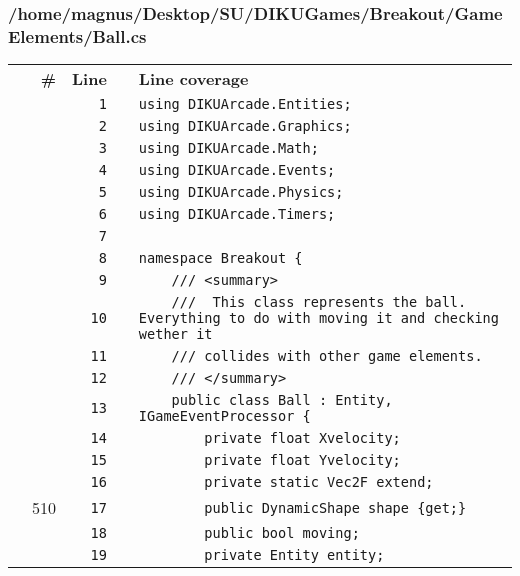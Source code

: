 \documentclass[a4paper,landscape,10pt]{article}
\begin{document}
\subsubsection{/home/magnus/Desktop/SU/DIKUGames/Breakout/GameElements/Ball.cs}
\begin{longtable}[l]{lrrll}
\textbf{} & \textbf{\#} & \textbf{Line} & \textbf{} & \textbf{Line coverage}\\
\cellcolor{gray} &  & \verb~1~ & & \verb~using DIKUArcade.Entities;~\\
\cellcolor{gray} &  & \verb~2~ & & \verb~using DIKUArcade.Graphics;~\\
\cellcolor{gray} &  & \verb~3~ & & \verb~using DIKUArcade.Math;~\\
\cellcolor{gray} &  & \verb~4~ & & \verb~using DIKUArcade.Events;~\\
\cellcolor{gray} &  & \verb~5~ & & \verb~using DIKUArcade.Physics;~\\
\cellcolor{gray} &  & \verb~6~ & & \verb~using DIKUArcade.Timers;~\\
\cellcolor{gray} &  & \verb~7~ & & \verb~~\\
\cellcolor{gray} &  & \verb~8~ & & \verb~namespace Breakout {~\\
\cellcolor{gray} &  & \verb~9~ & & \verb~    /// <summary>~\\
\cellcolor{gray} &  & \verb~10~ & & \verb~    ///  This class represents the ball. Everything to do with moving it and checking wether it~\\
\cellcolor{gray} &  & \verb~11~ & & \verb~    /// collides with other game elements.~\\
\cellcolor{gray} &  & \verb~12~ & & \verb~    /// </summary>~\\
\cellcolor{gray} &  & \verb~13~ & & \verb~    public class Ball : Entity, IGameEventProcessor {~\\
\cellcolor{gray} &  & \verb~14~ & & \verb~        private float Xvelocity;~\\
\cellcolor{gray} &  & \verb~15~ & & \verb~        private float Yvelocity;~\\
\cellcolor{gray} &  & \verb~16~ & & \verb~        private static Vec2F extend;~\\
\cellcolor{green} & 510 & \verb~17~ & & \verb~        public DynamicShape shape {get;}~\\
\cellcolor{gray} &  & \verb~18~ & & \verb~        public bool moving;~\\
\cellcolor{gray} &  & \verb~19~ & & \verb~        private Entity entity;~\\

\end{longtable}
\end{document}
